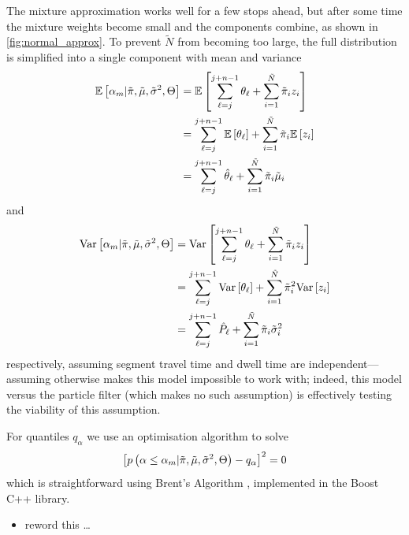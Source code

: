 The mixture approximation works well for a few stops ahead, but after some time the mixture weights become small and the components combine, as shown in \cref{fig:normal_approx}. To prevent $\tilde N$ from becoming too large, the full distribution is simplified into a single component with mean and variance
\begin{equation}
\label{eq:mixture_mean}
\begin{split}
\mathbb{E}\left[\alpha_m | \tilde\pi, \tilde\mu, \tilde\sigma^2, \Theta\right] &=
\mathbb{E}\left[\sum_{\ell=j}^{j+n-1} \theta_\ell +
  \sum_{i=1}^{\tilde N} \tilde\pi_i z_i\right] \\
&= \sum_{\ell=j}^{j+n-1} \mathbb{E}\left[\theta_\ell\right] +
  \sum_{i=1}^{\tilde N} \tilde\pi_i \mathbb{E}\left[z_i\right] \\
&= \sum_{\ell=j}^{j+n-1} \hat{\theta}_\ell +
  \sum_{i=1}^{\tilde N} \tilde\pi_i \tilde\mu_i
\end{split}
\end{equation}
and
\begin{equation}
\label{eq:mixture_variance}
\begin{split}
\mathrm{Var}\left[\alpha_m | \tilde\pi, \tilde\mu, \tilde\sigma^2, \Theta\right] &=
\mathrm{Var}\left[\sum_{\ell=j}^{j+n-1} \theta_\ell +
  \sum_{i=1}^{\tilde N} \tilde\pi_i z_i\right] \\
&= \sum_{\ell=j}^{j+n-1} \mathrm{Var}\left[\theta_\ell\right] +
  \sum_{i=1}^{\tilde N} \tilde\pi_i^2 \mathrm{Var}\left[z_i\right] \\
&= \sum_{\ell=j}^{j+n-1} \hat{P}_\ell +
  \sum_{i=1}^{\tilde N} \tilde\pi_i \tilde\sigma_i^2
\end{split}
\end{equation}
respectively, assuming segment travel time and dwell time are independent---assuming otherwise makes this model impossible to work with; indeed, this model versus the particle filter (which makes no such assumption) is effectively testing the viability of this assumption.


For quantiles $q_\alpha$ we use an optimisation algorithm to solve
\begin{equation}
\label{eq:mixture_quadratic}
\left[
  p\left(\alpha \leq \alpha_m | \tilde\pi, \tilde\mu, \tilde\sigma^2, \Theta\right) - q_\alpha
\right]^2 = 0
\end{equation}
which is straightforward using Brent's Algorithm \citep{Brent_1971}, implemented in the Boost \textsf{C++} library.


\begin{itemize}
\item reword this \ldots
\end{itemize}

